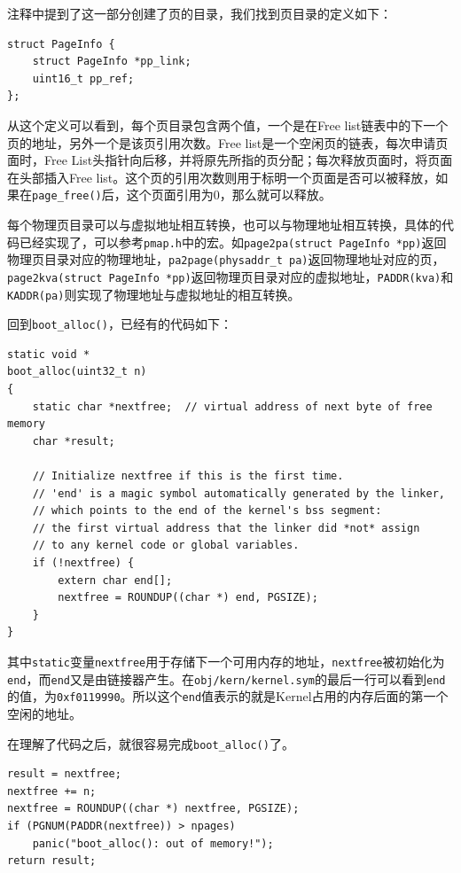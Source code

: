 \documentclass[11pt]{article}
\begin{document}
注释中提到了这一部分创建了页的目录，我们找到页目录的定义如下：

\begin{lstlisting}[title=inc/memlayout.h]
struct PageInfo {
	struct PageInfo *pp_link;
	uint16_t pp_ref;
};
\end{lstlisting}

从这个定义可以看到，每个页目录包含两个值，一个是在Free list链表中的下一个页的地址，另外一个是该页引用次数。Free list是一个空闲页的链表，每次申请页面时，Free List头指针向后移，并将原先所指的页分配；每次释放页面时，将页面在头部插入Free list。这个页的引用次数则用于标明一个页面是否可以被释放，如果在\lstinline|page_free()|后，这个页面引用为0，那么就可以释放。

每个物理页目录可以与虚拟地址相互转换，也可以与物理地址相互转换，具体的代码已经实现了，可以参考\lstinline|pmap.h|中的宏。如\lstinline|page2pa(struct PageInfo *pp)|返回物理页目录对应的物理地址，\lstinline|pa2page(physaddr_t pa)|返回物理地址对应的页，\lstinline|page2kva(struct PageInfo *pp)|返回物理页目录对应的虚拟地址，\lstinline|PADDR(kva)|和\lstinline|KADDR(pa)|则实现了物理地址与虚拟地址的相互转换。

回到\lstinline|boot_alloc()|，已经有的代码如下：
\begin{lstlisting}[title=kern/pmap.c]
static void *
boot_alloc(uint32_t n)
{
	static char *nextfree;	// virtual address of next byte of free memory
	char *result;
	
	// Initialize nextfree if this is the first time.
	// 'end' is a magic symbol automatically generated by the linker,
	// which points to the end of the kernel's bss segment:
	// the first virtual address that the linker did *not* assign
	// to any kernel code or global variables.
	if (!nextfree) {
		extern char end[];
		nextfree = ROUNDUP((char *) end, PGSIZE);
	}
}
\end{lstlisting}
其中\lstinline|static|变量\lstinline|nextfree|用于存储下一个可用内存的地址，\lstinline|nextfree|被初始化为\lstinline|end|，而\lstinline|end|又是由链接器产生。在\lstinline|obj/kern/kernel.sym|的最后一行可以看到\lstinline|end|的值，为\lstinline|0xf0119990|。所以这个\lstinline|end|值表示的就是Kernel占用的内存后面的第一个空闲的地址。

在理解了代码之后，就很容易完成\lstinline|boot_alloc()|了。
\begin{lstlisting}[title=kern/pmap.c]
result = nextfree;
nextfree += n;
nextfree = ROUNDUP((char *) nextfree, PGSIZE);
if (PGNUM(PADDR(nextfree)) > npages)
	panic("boot_alloc(): out of memory!");
return result;
\end{lstlisting}
\end{document}
